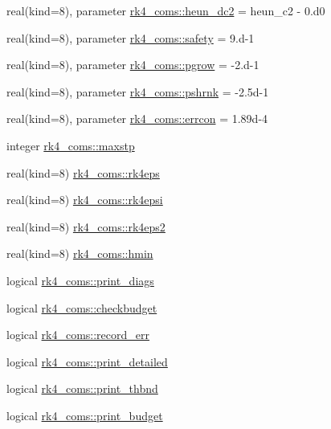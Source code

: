 \begin{DoxyCompactItemize}
\item 
real(kind=8), parameter \hyperlink{namespacerk4__coms_ad638286586253a3741b0fd05bd2456a3}{rk4\+\_\+coms\+::heun\+\_\+dc2} = heun\+\_\+c2 -\/ 0.d0
\item 
real(kind=8), parameter \hyperlink{namespacerk4__coms_ab0aa0551adf0417c09a0a0e4f4bcb934}{rk4\+\_\+coms\+::safety} = 9.d-\/1
\item 
real(kind=8), parameter \hyperlink{namespacerk4__coms_a796865569153ec93dae2cc10d6dd7909}{rk4\+\_\+coms\+::pgrow} = -\/2.d-\/1
\item 
real(kind=8), parameter \hyperlink{namespacerk4__coms_a83a7b5210aa05ed67147b0b6e4250f46}{rk4\+\_\+coms\+::pshrnk} = -\/2.\+5d-\/1
\item 
real(kind=8), parameter \hyperlink{namespacerk4__coms_a5b9d4d10eb75a3f0b44f3876ade2c3eb}{rk4\+\_\+coms\+::errcon} = 1.\+89d-\/4
\item 
integer \hyperlink{namespacerk4__coms_a9fc78b38e070c62f9669f9db9d966784}{rk4\+\_\+coms\+::maxstp}
\item 
real(kind=8) \hyperlink{namespacerk4__coms_aa154e17784b65f05a89af9b4f86bb879}{rk4\+\_\+coms\+::rk4eps}
\item 
real(kind=8) \hyperlink{namespacerk4__coms_a2d6ae9880c44662592dc0e0d238c3229}{rk4\+\_\+coms\+::rk4epsi}
\item 
real(kind=8) \hyperlink{namespacerk4__coms_a2b1484b3befa3c0d446279fa4001a56d}{rk4\+\_\+coms\+::rk4eps2}
\item 
real(kind=8) \hyperlink{namespacerk4__coms_a5bf08e5e23fca150f09adc446272b7fb}{rk4\+\_\+coms\+::hmin}
\item 
logical \hyperlink{namespacerk4__coms_a45d06376c0007b5db575b229cc2d11b1}{rk4\+\_\+coms\+::print\+\_\+diags}
\item 
logical \hyperlink{namespacerk4__coms_a9b8354d59e352fedb78f49d2195a9d7a}{rk4\+\_\+coms\+::checkbudget}
\item 
logical \hyperlink{namespacerk4__coms_a8758ba5171a32f83e20dd93601fa21d6}{rk4\+\_\+coms\+::record\+\_\+err}
\item 
logical \hyperlink{namespacerk4__coms_a9b7ff048a348436a9163405f31d72e29}{rk4\+\_\+coms\+::print\+\_\+detailed}
\item 
logical \hyperlink{namespacerk4__coms_ad87029f758f9a6906b3aea2205873427}{rk4\+\_\+coms\+::print\+\_\+thbnd}
\item 
logical \hyperlink{namespacerk4__coms_a062e3f5a857cb1364f87fda6223f2259}{rk4\+\_\+coms\+::print\+\_\+budget}
\item 

\end{DoxyCompactItemize}
